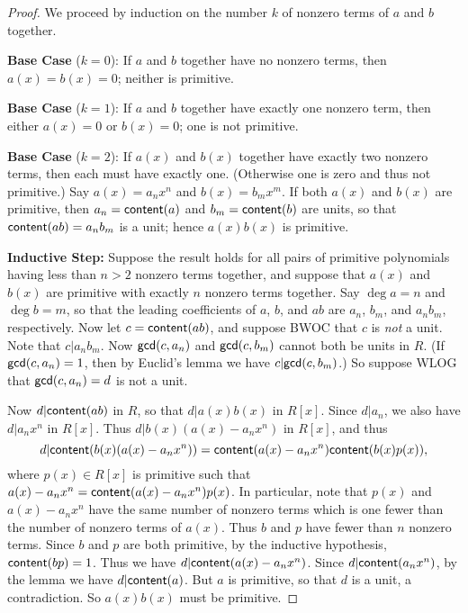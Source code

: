 \begin{proof}
We proceed by induction on the number \(k\) of nonzero terms of \(a\) and \(b\) together.

\textbf{Base Case} (\(k = 0\)): If \(a\) and \(b\) together have no nonzero terms, then \(a(x) = b(x) = 0\); neither is primitive.

\textbf{Base Case} (\(k = 1\)): If \(a\) and \(b\) together have exactly one nonzero term, then either \(a(x) = 0\) or \(b(x) = 0\); one is not primitive.

\textbf{Base Case} (\(k = 2\)): If \(a(x)\) and \(b(x)\) together have exactly two nonzero terms, then each must have exactly one. (Otherwise one is zero and thus not primitive.) Say \(a(x) = a_n x^n\) and \(b(x) = b_m x^m\). If both \(a(x)\) and \(b(x)\) are primitive, then \(a_n = \mathsf{content}(a)\) and \(b_m = \mathsf{content}(b)\) are units, so that \(\mathsf{content}(ab) = a_nb_m\) is a unit; hence \(a(x)b(x)\) is primitive.

\textbf{Inductive Step:} Suppose the result holds for all pairs of primitive polynomials having less than \(n > 2\) nonzero terms together, and suppose that \(a(x)\) and \(b(x)\) are primitive with exactly \(n\) nonzero terms together. Say \(\deg{a} = n\) and \(\deg{b} = m\), so that the leading coefficients of \(a\), \(b\), and \(ab\) are \(a_n\), \(b_m\), and \(a_nb_m\), respectively. Now let \(c = \mathsf{content}(ab)\), and suppose BWOC that \(c\) is \emph{not} a unit. Note that \(c|a_nb_m\). Now \(\mathsf{gcd}(c, a_n)\) and \(\mathsf{gcd}(c, b_m)\) cannot both be units in \(R\). (If \(\mathsf{gcd}(c, a_n) = 1\), then by Euclid's lemma we have \(c | \mathsf{gcd}(c, b_m)\).) So suppose WLOG that \(\mathsf{gcd}(c, a_n) = d\) is not a unit.

Now \(d|\mathsf{content}(ab)\) in \(R\), so that \(d|a(x)b(x)\) in \(R[x]\). Since \(d|a_n\), we also have \(d|a_nx^n\) in \(R[x]\). Thus \(d|b(x)(a(x) - a_nx^n)\) in \(R[x]\), and thus \[ d | \mathsf{content}(b(x)(a(x) - a_nx^n)) = \mathsf{content}(a(x) - a_nx^n)\mathsf{content}(b(x)p(x)), \] where \(p(x) \in R[x]\) is primitive such that \(a(x) - a_nx^n = \mathsf{content}(a(x) - a_nx^n)p(x)\). In particular, note that \(p(x)\) and \(a(x) - a_nx^n\) have the same number of nonzero terms which is one fewer than the number of nonzero terms of \(a(x)\). Thus \(b\) and \(p\) have fewer than \(n\) nonzero terms. Since \(b\) and \(p\) are both primitive, by the inductive hypothesis, \(\mathsf{content}(bp) = 1\). Thus we have \(d|\mathsf{content}(a(x) - a_nx^n)\). Since \(d|\mathsf{content}(a_nx^n)\), by the lemma we have \(d|\mathsf{content}(a)\). But \(a\) is primitive, so that \(d\) is a unit, a contradiction. So \(a(x)b(x)\) must be primitive.
\end{proof}

